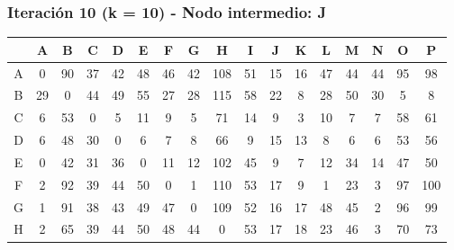 \documentclass[12pt]{article}
\begin{document}
\subsubsection{Iteración 10 (k = 10) - Nodo intermedio: J}
\begin{table}[h!]
\centering
\begin{tabular}{|c|c|c|c|c|c|c|c|c|c|c|c|c|c|c|c|c|}
\hline
 & A & B & C & D & E & F & G & H & I & J & K & L & M & N & O & P \\\hline
A & 0 & \cellcolor{lightgreen} 90 & \cellcolor{lightgreen} 37 & \cellcolor{lightgreen} 42 & \cellcolor{lightgreen} 48 & \cellcolor{lightgreen} 46 & \cellcolor{lightgreen} 42 & \cellcolor{lightgreen} 108 & \cellcolor{lightgreen} 51 & 15 & 16 & \cellcolor{lightgreen} 47 & \cellcolor{lightgreen} 44 & \cellcolor{lightgreen} 44 & \cellcolor{lightgreen} 95 & \cellcolor{lightgreen} 98 \\\hline
B & 29 & 0 & \cellcolor{lightgreen} 44 & \cellcolor{lightgreen} 49 & \cellcolor{lightgreen} 55 & 27 & 28 & \cellcolor{lightgreen} 115 & \cellcolor{lightgreen} 58 & 22 & 8 & 28 & 50 & 30 & 5 & 8 \\\hline
C & 6 & 53 & 0 & 5 & 11 & 9 & 5 & 71 & 14 & 9 & 3 & 10 & 7 & 7 & 58 & 61 \\\hline
D & 6 & 48 & 30 & 0 & 6 & 7 & 8 & 66 & 9 & 15 & 13 & 8 & 6 & 6 & 53 & 56 \\\hline
E & 0 & 42 & \cellcolor{lightgreen} 31 & \cellcolor{lightgreen} 36 & 0 & 11 & 12 & \cellcolor{lightgreen} 102 & \cellcolor{lightgreen} 45 & 9 & 7 & 12 & 34 & 14 & 47 & 50 \\\hline
F & 2 & \cellcolor{lightgreen} 92 & \cellcolor{lightgreen} 39 & \cellcolor{lightgreen} 44 & \cellcolor{lightgreen} 50 & 0 & 1 & \cellcolor{lightgreen} 110 & \cellcolor{lightgreen} 53 & 17 & 9 & 1 & 23 & 3 & \cellcolor{lightgreen} 97 & \cellcolor{lightgreen} 100 \\\hline
G & 1 & \cellcolor{lightgreen} 91 & \cellcolor{lightgreen} 38 & \cellcolor{lightgreen} 43 & \cellcolor{lightgreen} 49 & \cellcolor{lightgreen} 47 & 0 & \cellcolor{lightgreen} 109 & \cellcolor{lightgreen} 52 & 16 & 17 & \cellcolor{lightgreen} 48 & \cellcolor{lightgreen} 45 & 2 & \cellcolor{lightgreen} 96 & \cellcolor{lightgreen} 99 \\\hline
H & 2 & 65 & \cellcolor{lightgreen} 39 & \cellcolor{lightgreen} 44 & \cellcolor{lightgreen} 50 & \cellcolor{lightgreen} 48 & \cellcolor{lightgreen} 44 & 0 & \cellcolor{lightgreen} 53 & 17 & 18 & 23 & \cellcolor{lightgreen} 46 & 3 & 70 & 73 \\\hline

\end{tabular}
\end{table}
\end{document}
